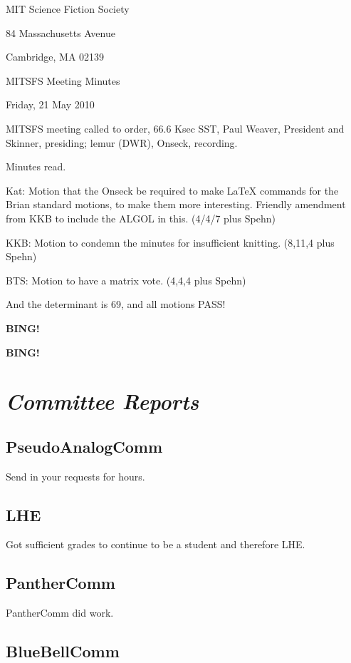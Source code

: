 \documentclass[10pt]{article}
\newcommand{\bing}{{\bf BING!} }
\newcommand{\goto}[1]{\bing \vskip 12pt \section*{{\em{#1}}}}
\newcommand{\ps}{ plus Spehn\xspace}
\newcommand{\skinner}{Paul  Weaver, President and Skinner}
\newcommand{\onseck}{lemur (DWR), Onseck}
\newcommand{\meetingdate}{Friday, 21 May 2010}
\begin{document}
\begin{center}

MIT Science Fiction Society

84 Massachusetts Avenue

Cambridge, MA 02139

\vspace{12pt}

MITSFS Meeting Minutes

\meetingdate

\end{center}

\vspace{18pt}

\setlength{\parskip}{6pt}

\noindent
MITSFS meeting called to order, 66.6 Ksec SST,
\skinner, presiding; \onseck, recording.

Minutes read.

Kat: Motion that the Onseck be required to make LaTeX commands for the Brian
standard motions, to make them more interesting.  Friendly amendment from KKB
to include the ALGOL in this. (4/4/7\ps)

KKB: Motion to condemn the minutes for insufficient knitting. (8,11,4\ps)

BTS: Motion to have a matrix vote. (4,4,4\ps)

And the determinant is 69, and all motions PASS!


\bing

\goto{Committee Reports}

\subsection*{PseudoAnalogComm}

Send in your requests for hours.

\subsection*{LHE}

Got sufficient grades to continue to be a student and therefore LHE.

\subsection*{PantherComm}

PantherComm did work.

\subsection*{BlueBellComm}
\end{document}
